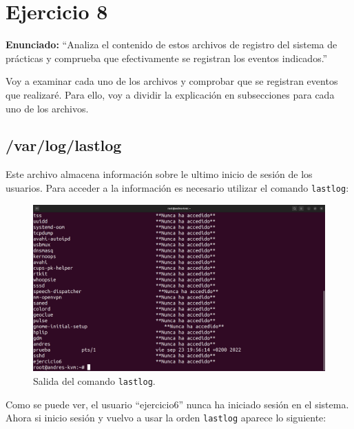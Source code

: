 \documentclass{article}
\begin{document}
\newpage

\section{Ejercicio 8}

\textbf{Enunciado: }``Analiza el contenido de estos archivos de registro del sistema de prácticas y comprueba que efectivamente se registran los eventos indicados.''

\bigskip

Voy a examinar cada uno de los archivos y comprobar que se registran eventos que realizaré. Para ello, voy a dividir la explicación en subsecciones para cada uno de los archivos.

\subsection{/var/log/lastlog}
Este archivo almacena información sobre le ultimo inicio de sesión de los usuarios. Para acceder a la información es necesario utilizar el comando \verb|lastlog|:

\begin{figure}[H]
    \includegraphics[width=\textwidth]{imagenes/lastlogejercicio6never.png}
    \caption{Salida del comando \texttt{lastlog}.}
\end{figure}

\newpage

Como se puede ver, el usuario ``ejercicio6'' nunca ha iniciado sesión en el sistema. Ahora si inicio sesión y vuelvo a usar la orden \verb|lastlog| aparece lo siguiente:
\end{document}
